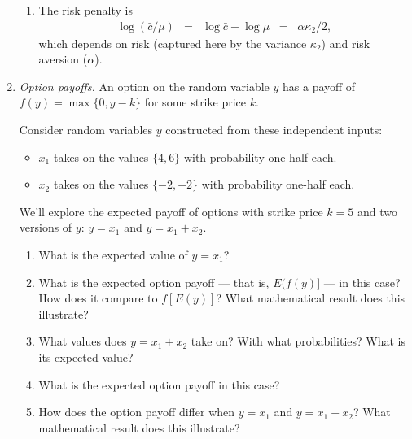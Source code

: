 \documentclass[11pt]{article}
\begin{document}
\begin{enumerate}
\begin{enumerate}
\item The risk penalty is
\begin{eqnarray*}
    \log (\bar{c}/\mu) &=& \log \bar{c} - \log \mu \;\;=\;\; \alpha\kappa_2/2 ,
\end{eqnarray*}
which depends on risk (captured here by the variance $\kappa_2$)
and risk aversion ($\alpha$).
\end{enumerate}


\item {\it Option payoffs.\/}
An option on the random variable $y$ has a payoff of $ f(y) = \max \{ 0, y-k \} $
for some strike price $k$.

Consider random variables $y$ constructed from these independent inputs:
\begin{itemize}
\item $x_1$ takes on the values $\{ 4, 6\} $ with probability one-half each.
\item $x_2$ takes on the values $\{ -2, +2\} $ with probability one-half each.
\end{itemize}
%
We'll explore the expected payoff of options with strike price $k=5$
and two versions of $y$:  $y = x_1$ and $y = x_1 + x_2 $.

%
\begin{enumerate}
\item What is the expected value of $y = x_1$?

\item What is the expected option payoff --- that is, $E (f(y)]$ --- in this case?
How does it compare to $f [E(y)]$?
What mathematical result does this illustrate?

\item What values does $ y = x_1 + x_2$ take on?
With what probabilities?
What is its expected value?

\item What is the expected option payoff in this case?

\item How does the option payoff differ when $y = x_1$ and $y = x_1 + x_2$?
What mathematical result does this illustrate?
\end{enumerate}


\end{enumerate}
\end{document}
